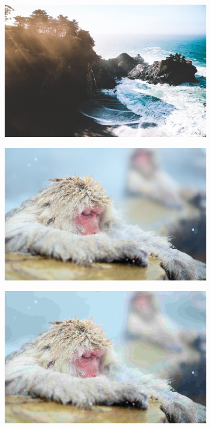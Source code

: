 \documentclass{article}
\begin{document}
\begin{figure}
\begin{subfigure}[b]{0.49 \textwidth}
    \end{subfigure}
    \begin{subfigure}[b]{0.49 \textwidth}
    \includegraphics[width=\textwidth]{Images/jpeg/reconstructed/test1_90.png}
    \end{subfigure}
    \begin{subfigure}[b]{0.49 \textwidth}
    \includegraphics[width=\textwidth]{Images/test2.png}
    \end{subfigure}
    \begin{subfigure}[b]{0.49 \textwidth}
    \includegraphics[width=\textwidth]{Images/jpeg/reconstructed/test2_10.png}

\end{subfigure}
\end{figure}
\end{document}
